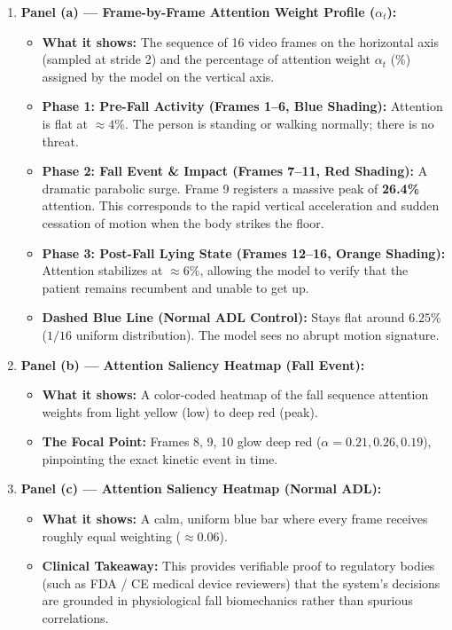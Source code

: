 \documentclass[11pt,a4paper]{article}
\begin{document}
\begin{enumerate}
    \item \textbf{Panel (a) --- Frame-by-Frame Attention Weight Profile ($\alpha_t$):}
    \begin{itemize}
        \item \textbf{What it shows:} The sequence of 16 video frames on the horizontal axis (sampled at stride 2) and the percentage of attention weight $\alpha_t$ (\%) assigned by the model on the vertical axis.
        \item \textbf{Phase 1: Pre-Fall Activity (Frames 1--6, Blue Shading):} Attention is flat at $\approx 4\%$. The person is standing or walking normally; there is no threat.
        \item \textbf{Phase 2: Fall Event \& Impact (Frames 7--11, Red Shading):} A dramatic parabolic surge. Frame 9 registers a massive peak of \textbf{26.4\%} attention. This corresponds to the rapid vertical acceleration and sudden cessation of motion when the body strikes the floor.
        \item \textbf{Phase 3: Post-Fall Lying State (Frames 12--16, Orange Shading):} Attention stabilizes at $\approx 6\%$, allowing the model to verify that the patient remains recumbent and unable to get up.
        \item \textbf{Dashed Blue Line (Normal ADL Control):} Stays flat around $6.25\%$ ($1/16$ uniform distribution). The model sees no abrupt motion signature.
    \end{itemize}

    \item \textbf{Panel (b) --- Attention Saliency Heatmap (Fall Event):}
    \begin{itemize}
        \item \textbf{What it shows:} A color-coded heatmap of the fall sequence attention weights from light yellow (low) to deep red (peak).
        \item \textbf{The Focal Point:} Frames 8, 9, 10 glow deep red ($\alpha = 0.21, 0.26, 0.19$), pinpointing the exact kinetic event in time.
    \end{itemize}

    \item \textbf{Panel (c) --- Attention Saliency Heatmap (Normal ADL):}
    \begin{itemize}
        \item \textbf{What it shows:} A calm, uniform blue bar where every frame receives roughly equal weighting ($\approx 0.06$).
        \item \textbf{Clinical Takeaway:} This provides verifiable proof to regulatory bodies (such as FDA / CE medical device reviewers) that the system's decisions are grounded in physiological fall biomechanics rather than spurious correlations.
    \end{itemize}
\end{enumerate}
\end{document}
